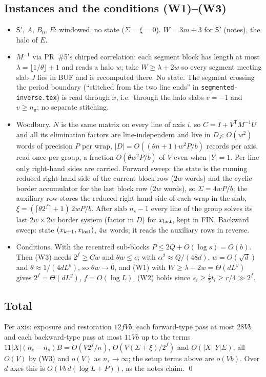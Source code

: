 \documentclass[11pt]{article}
\theoremstyle{definition}\newtheorem{definition}{Definition}
\theoremstyle{remark}\newtheorem*{remark}{Remark}
\begin{document}
\subsection{Instances and the conditions (W1)--(W3)}\label{sec:instances}
\begin{itemize}
\item $\mathsf S'$, $A$, $B_0$, $E$: windowed, no state ($\Sigma=\xi=0$). $W=3m+3$ for
$\mathsf S'$ (notes), the halo of $E$.
\item $M^{-1}$ via PR~\#5's chirped correlation: each segment block has length at most
$\lambda=\lfloor1/\theta\rfloor+1$ and reads a halo $w$; take $W\ge\lambda+2w$ so every segment
meeting slab $J$ lies in BUF and is recomputed there. No state. The segment crossing the period
boundary (``stitched from the two line ends'' in \texttt{segmented-inverse.tex}) is read through
$\tilde x$, i.e.\ through the halo slabs $v=-1$ and $v\ge n_\pi$; no separate stitching.
\item Woodbury. $N$ is the same matrix on every line of axis $i$, so $C=I+V^{\mathsf T}M^{-1}U$
and all its elimination factors are line-independent and live in $D_J$: $O(w^2)$ words of
precision $P$ per wrap, $|D|=O((\theta n+1)w^2P/b)$ records per axis, read once per group, a
fraction $O(\theta w^2P/b)$ of $V$ even when $|Y|=1$. Per line only right-hand sides are
carried. Forward sweep: the state is the running reduced right-hand side of the current block
row ($2w$ words) and the cyclic-border accumulator for the last block row ($2w$ words), so
$\Sigma=4wP/b$; the auxiliary row stores the reduced right-hand side of each wrap in the slab,
$\xi=(\lceil\theta2^f\rceil+1)\,2wP/b$. After slab $n_s-1$ every line of the group solves its
last $2w\times2w$ border system (factor in $D$) for $x_{\rm last}$, kept in FIN. Backward sweep:
state $(x_{k+1},x_{\rm last})$, $4w$ words; it reads the auxiliary rows in reverse.
\item Conditions. With the recentred sub-blocks $P\le2Q+O(\log s)=O(b)$. Then (W3) needs
$2^f\ge C w$ and $\theta w\le c$; with $\alpha^2\approx Q/(48d)$, $w=O(\sqrt d)$ and
$\theta\approx1/(4dL^y)$, so $\theta w\to0$, and (W1) with $W\ge\lambda+2w=\Theta(dL^y)$ gives
$2^f=\Theta(dL^y)$, $f=O(\log L)$. (W2) holds since $s_i\ge\tfrac45 t_i\ge r/4\gg2^f$.
\end{itemize}

\subsection{Total}
Per axis: exposure and restoration $12fVb$; each forward-type pass at most $28Vb$ and each
backward-type pass at most $11Vb$ up to the terms $11|X|(n_e-n_s)B=O(V2^f/n)$,
$O(V(\Sigma+\xi)/2^f)$ and $O(|X||Y|\Sigma)$, all $O(V)$ by (W3) and $o(V)$ as $n_s\to\infty$;
the setup terms above are $o(Vb)$. Over $d$ axes this is $O(Vb\,d(\log L+P))$, as the notes
claim. \qed
\end{document}
